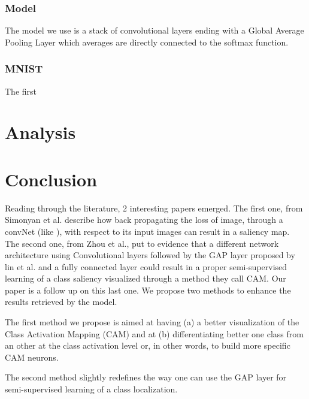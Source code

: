 \documentclass[12pt, letterpaper, twoside]{article}
\begin{document}
	\subsubsection{Model}
	\label{ssub:model}
	The model we use is a stack of convolutional layers ending with a Global Average Pooling Layer which averages are directly connected to the softmax function.
	

	\subsubsection{MNIST} 
	\label{ssub:mnist}
	The first 


	\section{Analysis}
	\label{sec:analysis}
	

	\section{Conclusion}
	\label{sec:conclusion}

	Reading through the literature, 2 interesting papers emerged. The first one, from Simonyan et al.\cite{simonyan2013deep} describe how back propagating the loss of image, through a convNet (like \cite{lecun1998gradient}), with respect to its input images can result in a saliency map. The second one, from Zhou et al.\cite{zhou2016learning}, put to evidence that a different network architecture using Convolutional layers followed by the GAP layer proposed by lin et al.\cite{lin2013network} and a fully connected layer could result in a proper semi-supervised learning of a class saliency visualized through a method they call CAM. Our paper is a follow up on this last one. We propose two methods to enhance the results retrieved by the model.

	The first method we propose is aimed at having (a) a better visualization of the Class Activation Mapping (CAM) and at (b) differentiating better one class from an other at the class activation level or, in other words, to build more specific CAM neurons.

	The second method slightly redefines the way one can use the GAP layer for semi-supervised learning of a class localization. 
\end{document}
